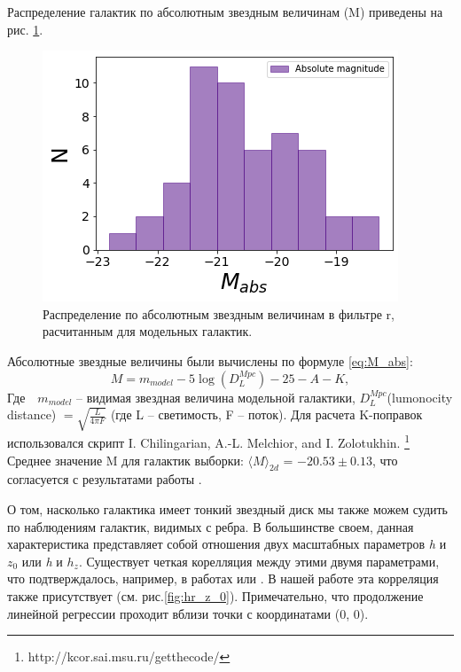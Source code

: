 Распределение галактик по абсолютным звездным величинам (M) приведены на рис. \ref{fig:M_abs}.
\begin{figure}[th]
    \centering
    \includegraphics[width=.9\textwidth]{plot_results/M_abs.png}
    \caption{Распределение по абсолютным звездным величинам в фильтре r, расчитанным для модельных галактик. }\label{fig:M_abs}
\end{figure}
Абсолютные звездные величины были вычислены по формуле \ref{eq:M_abs}:
\begin{equation}
    M = m_{model}-5\log(D_L^{Mpc})-25-A-K,
    \label{eq:M_abs}
\end{equation}
Где $\textrm{ }m_{model}$ -- видимая звездная величина модельной галактики, $D_L^{Mpc}$(lumonocity distance) $=\sqrt{{\frac{L}{4\pi F}}}$ (где L -- светимость, F -- поток). Для расчета K-поправок использовался скрипт I. Chilingarian, A.-L. Melchior, and I. Zolotukhin. \footnote{http://kcor.sai.msu.ru/getthecode/}
Среднее значение M для галактик выборки: $\langle M \rangle_{2d}$ = $-20.53 \pm 0.13$, что согласуется с результатами работы \citep{2014ApJ...787...24B}.

О том, насколько галактика имеет тонкий звездный диск мы также можем судить по наблюдениям галактик, видимых с ребра. В большинстве своем, данная характеристика представляет собой отношения двух масштабных параметров \textit{h} и $z_0$ или \textit{h} и $h_z$. Существует четкая корелляция между этими двумя параметрами, что подтверждалось, например, в работах \citep{2002MNRAS.334..646K} или \citep{2010MNRAS.401..559M}. В нашей работе эта корреляция также присутствует (см. рис.\ref{fig:hr_z_0}). Примечательно, что продолжение линейной регрессии проходит вблизи точки с координатами (0, 0). 

